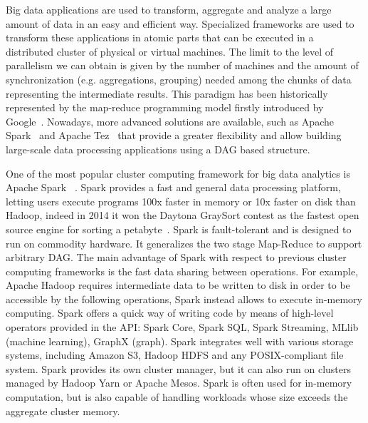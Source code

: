 Big data applications are used to transform, aggregate and analyze a large amount of data in an easy and efficient way. Specialized frameworks are used to transform these applications in atomic parts that can be executed in a distributed cluster of physical or virtual machines. The limit to the level of parallelism we can obtain is given by the number of machines and the amount of synchronization (e.g. aggregations, grouping) needed among the chunks of data representing the intermediate results. This paradigm has been historically represented by the map-reduce programming model firstly introduced by Google~\cite{misc:GoogleMapReduce}. Nowadays, more advanced solutions are available, such as Apache Spark~\cite{misc:ApacheSpark} and Apache Tez~\cite{misc:ApacheTez} that provide a greater flexibility and allow building large-scale data processing applications using a DAG based structure.

One of the most popular cluster computing framework for big data analytics is Apache Spark  ~\cite{articleApacheSpark:2015}. Spark provides a fast and general data processing platform, letting users execute programs 100x faster in memory or 10x faster on disk than Hadoop, indeed in 2014 it won the Daytona GraySort contest as the fastest open source engine for sorting a petabyte~\cite{articleApacheSpark:2016}. Spark is fault-tolerant and is designed to run on commodity hardware. It generalizes the two stage Map-Reduce to support arbitrary DAG. The main advantage of Spark with respect to previous cluster computing frameworks is the fast data sharing between operations. For example, Apache Hadoop requires intermediate data to be written to disk in order to be accessible by the following operations, Spark instead allows to execute in-memory computing. Spark offers a quick way of writing code by means of high-level operators provided in the API: Spark Core, Spark SQL, Spark Streaming, MLlib (machine learning), GraphX (graph). Spark integrates well with various storage systems,  including Amazon S3, Hadoop HDFS and any POSIX-compliant file system. Spark provides its own cluster manager, but it can also run on clusters managed by Hadoop Yarn or Apache Mesos. Spark is often used for in-memory computation, but is also capable of handling workloads whose size exceeds the aggregate cluster memory. 


